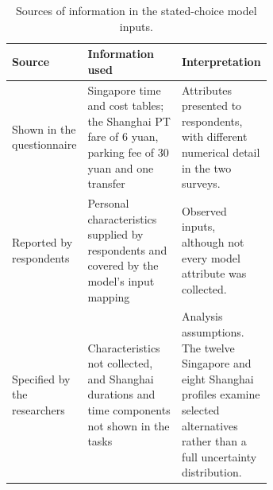 \begin{table}[pos=htbp]
\centering\small
\caption{Sources of information in the stated-choice model inputs.}
\label{tab:input_provenance}
\renewcommand{\arraystretch}{1.13}
\begin{tabularx}{\linewidth}{@{}>{\raggedright\arraybackslash}p{0.22\linewidth}>{\raggedright\arraybackslash}p{0.43\linewidth}>{\raggedright\arraybackslash}X@{}}
\toprule
Source & Information used & Interpretation \\
\midrule
Shown in the questionnaire & Singapore time and cost tables; the Shanghai PT fare of 6 yuan, parking fee of 30 yuan and one transfer & Attributes presented to respondents, with different numerical detail in the two surveys. \\
Reported by respondents & Personal characteristics supplied by respondents and covered by the model's input mapping & Observed inputs, although not every model attribute was collected. \\
Specified by the researchers & Characteristics not collected, and Shanghai durations and time components not shown in the tasks & Analysis assumptions. The twelve Singapore and eight Shanghai profiles examine selected alternatives rather than a full uncertainty distribution. \\
\bottomrule
\end{tabularx}
\end{table}
\FloatBarrier
